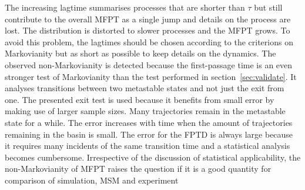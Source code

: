 The increasing lagtime summarises processes that are shorter than $\tau$ but still contribute to the overall MFPT as a single jump and details on the process are lost. The distribution is distorted to slower processes and the MFPT grows. To avoid this problem, the lagtimes should be chosen according to the criterions on Markovianity but as short as possible to keep details on the dynamics. The observed non-Markovianity is detected because the first-passage time is an even stronger test of Markovianity than the test performed in section~\ref{sec:validate}. It analyses transitions between two metastable states and not just the exit from one. The presented exit test is used because it benefits from small error by making use of larger sample sizes. Many trajectories remain in the metastable state for a while. The error increases with time when the amount of trajectories remaining in the basin is small. The error for the FPTD is always large because it requires many incidents of the same transition time and a statistical analysis becomes cumbersome. Irrespective of the discussion of statistical applicability, the non-Markovianity of MFPT raises the question if it is a good quantity for comparison of simulation, MSM and experiment 


 


% 
% 
% 
% 
% 
% 
